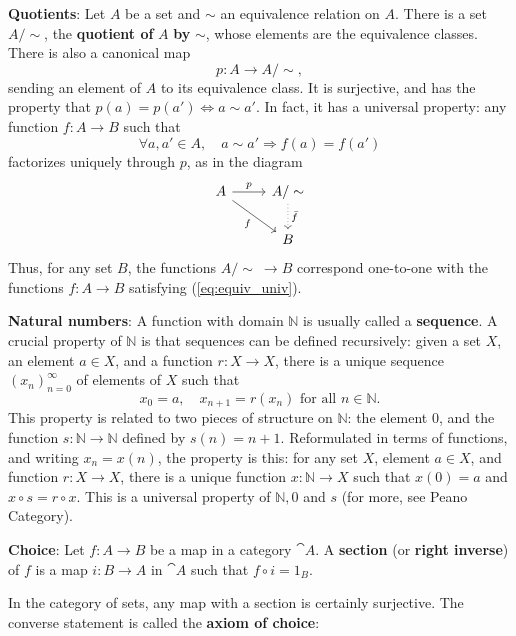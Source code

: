 \bigskip\noindent\textbf{Quotients}: Let $A$ be a set and $\sim$ an equivalence relation on $A$. There is a set $A/\sim$, the \textbf{quotient of} $A$ \textbf{by} $\sim$, whose elements are the equivalence classes. There is also a canonical map
\begin{equation*}
    p: A\to A/\sim,
\end{equation*}
sending an element of $A$ to its equivalence class. It is surjective, and has the property that $p(a)=p(a') \Longleftrightarrow a\sim a'$. In fact, it has a universal property: any function $f:A\to B$ such that
\begin{equation}\label{eq:equiv_univ}
    \forall a,a'\in A, \quad a\sim a' \Rightarrow f(a)=f(a')
\end{equation}
factorizes uniquely through $p$, as in the diagram
\begin{equation*}
\begin{tikzcd}
    A \arrow[r, "p"] \arrow[dr, "f"'] & A/\sim \arrow[d, dotted, "\bar{f}"] \\
    & B
\end{tikzcd}
\end{equation*}
Thus, for any set $B$, the functions $A/\sim\ \to B$ correspond one-to-one with the functions $f:A\to B$ satisfying (\ref{eq:equiv_univ}).\par

\bigskip\noindent\textbf{Natural numbers}: A function with domain $\mathbb{N}$ is usually called a \textbf{sequence}. A crucial property of $\mathbb{N}$ is that sequences can be defined recursively: given a set $X$, an element $a\in X$, and a function $r:X\to X$, there is a unique sequence $(x_n)_{n=0}^{\infty}$ of elements of $X$ such that
\begin{equation*}
    x_0=a,\quad x_{n+1}=r(x_n) \text{ for all } n\in\mathbb{N}.
\end{equation*}
This property is related to two pieces of structure on $\mathbb{N}$: the element $0$, and the function $s:\mathbb{N}\to\mathbb{N}$ defined by $s(n)=n+1$. Reformulated in terms of functions, and writing $x_n=x(n)$, the property is this: for any set $X$, element $a\in X$, and function $r:X\to X$, there is a unique function $x:\mathbb{N}\to X$ such that $x(0)=a$ and $x\circ s=r\circ x$. This is a universal property of $\mathbb{N}, 0$ and $s$ (for more, see Peano Category).\par

\bigskip\noindent\textbf{Choice}: Let $f:A\to B$ be a map in a category $\cat{A}$. A \textbf{section} (or \textbf{right inverse}) of $f$ is a map $i: B\to A$ in $\cat{A}$ such that $f\circ i=1_B$.\par
In the category of sets, any map with a section is certainly surjective. The converse statement is called the \textbf{axiom of choice}:

